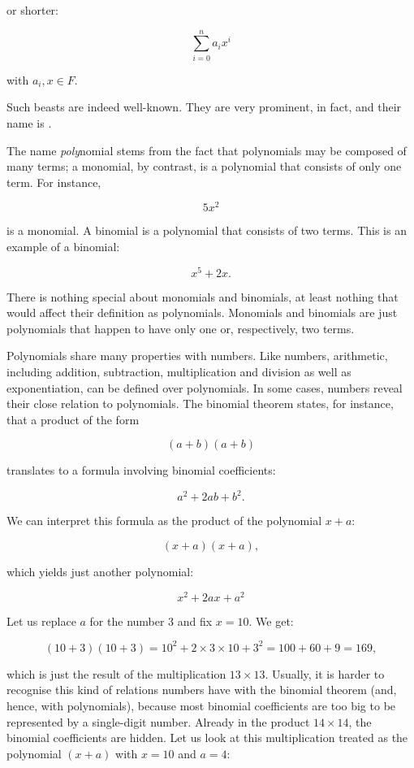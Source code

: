 \documentclass[tikz]{scrreprt}
\begin{document}
or shorter:

\[
\sum_{i=0}^n{a_ix^i}
\]

with $a_i, x \in F$.

Such beasts are indeed well-known. They are very prominent, in fact,
and their name is .

The name \emph{poly}nomial stems from the fact
that polynomials may be composed of many terms;
a monomial, by contrast, is a polynomial 
that consists of only one term.
For instance,

\[
5x^2
\]

is a monomial. A binomial is a polynomial
that consists of two terms. This is
an example of a binomial:

\[
x^5 + 2x.
\]

There is nothing special about
monomials and binomials, at least nothing
that would affect their definition as polynomials.
Monomials and binomials are just
polynomials that happen to have only
one or, respectively, two terms.

Polynomials share many properties with numbers.
Like numbers, arithmetic, including
addition, subtraction, multiplication and division
as well as exponentiation, can be defined over polynomials. 
In some cases, numbers reveal their close relation
to polynomials. The binomial theorem states,
for instance, that a product of the form 

\[
(a+b)(a+b)
\]

translates to a formula involving binomial coefficients:

\[
a^2 + 2ab + b^2.
\]

We can interpret this formula as the product 
of the polynomial $x+a$:

\[
(x+a)(x+a),
\]

which yields just another polynomial:

\[
x^2 + 2ax + a^2
\]

Let us replace $a$ for the number 3
and fix $x=10$. We get:

\begin{equation}
(10+3)(10+3) = 10^2 + 2\times 3\times 10 + 3^2 = 100 + 60 + 9 = 169,
\end{equation}

which is just the result of the multiplication $13\times 13$.
Usually, it is harder to recognise this kind of relations 
numbers have with the binomial theorem (and, hence, with polynomials),
because most binomial coefficients are too big to be represented
by a single-digit number. Already in the product $14\times 14$,
the binomial coefficients are hidden. Let us look at this multiplication
treated as the polynomial $(x+a)$ with $x=10$ and $a=4$:
\end{document}
